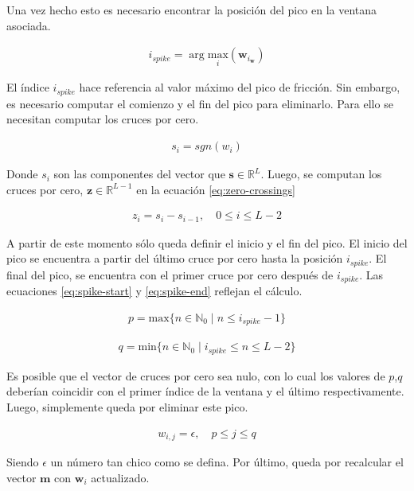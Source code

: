 \indent Una vez hecho esto es necesario encontrar la posición del pico en la ventana asociada.

\begin{align}
  i_{spike} = \arg \underset{i}{\mathrm{max}} (\bm{w}_{i_{\bm{w}}})
\end{align}

\indent El índice $i_{spike}$ hace referencia al valor máximo del pico de fricción. Sin embargo, es necesario
computar el comienzo y el fin del pico para eliminarlo. Para ello se necesitan computar los cruces por cero.

\begin{align}
  s_i = sgn(w_i)
\end{align}

\indent Donde $s_i$ son las componentes del vector que $\mathbf{s} \in \mathbb{R}^L$. Luego, se computan los
cruces por cero, $\mathbf{z} \in \mathbb{R}^{L-1}$ en la ecuación \ref{eq:zero-crossings}

\begin{align} \label{eq:zero-crossings}
z_i = s_i - s_{i-1}, \quad 0 \leq i \leq L-2
\end{align}

\indent A partir de este momento sólo queda definir el inicio y el fin del pico. El inicio del pico se encuentra a
partir del último cruce por cero hasta la posición $i_{spike}$. El final del pico, se encuentra con el primer cruce
por cero después de $i_{spike}$. Las ecuaciones \ref{eq:spike-start} y \ref{eq:spike-end} reflejan el cálculo.

\begin{align} \label{eq:spike-start}
p = \mathrm{max}\big\{n \in \mathbb{N}_0 \; | \; n \leq i_{spike}-1\big\}
\end{align}

\begin{align} \label{eq:spike-end}
q = \mathrm{min}\big\{n \in \mathbb{N}_0 \; | \; i_{spike} \leq n \leq L-2\big\}
\end{align}

\indent Es posible que el vector de cruces por cero sea nulo, con lo cual los valores de $p$,$q$ deberían coincidir
con el primer índice de la ventana y el último respectivamente. Luego, simplemente queda por eliminar este pico.

\begin{align}
  w_{i,j} = \epsilon, \quad p \leq j \leq q
\end{align}

\indent Siendo $\epsilon$ un número tan chico como se defina. Por último, queda por recalcular el vector
$\mathbf{m}$ con $\mathbf{w}_i$ actualizado. \bigskip

